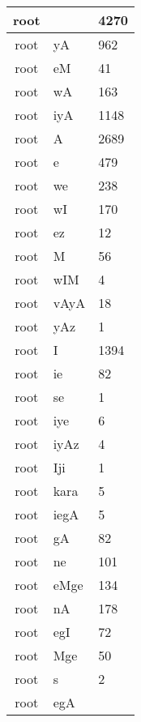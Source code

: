 \documentclass[a4 paper]{article}
\begin{document}
\begin{longtable}{cp{}p{}}
root &  & 4270\\ \midrule root & yA & 962\\ \midrule root & eM & 41\\ \midrule root & wA & 163\\ \midrule root & iyA & 1148\\ \midrule root & A & 2689\\ \midrule root & e & 479\\ \midrule root & we & 238\\ \midrule root & wI & 170\\ \midrule root & ez & 12\\ \midrule root & M & 56\\ \midrule root & wIM & 4\\ \midrule root & vAyA & 18\\ \midrule root & yAz & 1\\ \midrule root & I & 1394\\ \midrule root & ie & 82\\ \midrule root & se & 1\\ \midrule root & iye & 6\\ \midrule root & iyAz & 4\\ \midrule root & Iji & 1\\ \midrule root & kara & 5\\ \midrule root & iegA & 5\\ \midrule root & gA & 82\\ \midrule root & ne & 101\\ \midrule root & eMge & 134\\ \midrule root & nA & 178\\ \midrule root & egI & 72\\ \midrule root & Mge & 50\\ \midrule root & s & 2\\ \midrule root & egA
\end{longtable}
\end{document}
